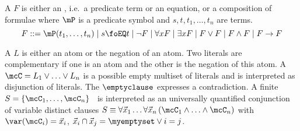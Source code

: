%
\begin{definition}\label{def:first-order}
A  $F$ is either an
, i.e.~a predicate term or an equation, or a composition of formulae where $\mP$ is a predicate symbol and $s,t,t_1,\ldots,t_n$ are terms.
%
\[
 F ::= \mP(t_1,\ldots,t_n) \mid
	s \foEQ t \mid
	\lnot F \mid
	\forall x F \mid
	\exists x F \mid
	 F\lor F \mid
	 F\land F \mid
	 F\rightarrow F
\]
\end{definition}
\begin{definition}\label{def:literals}
A  $L$ is either an atom
or the negation of an atom.
Two literals are complementary if one is an atom and the other is the negation of this atom.
%
A \ \ $\mcC = L_1\lor\ldots\lor L_n$  is a possible empty multiset of literals and is interpreted as disjunction of literals.
The  $\emptyclause$ expresses a contradiction.
A finite  $S=\{ \mcC_1,\ldots,\mcC_n \}$ 
is interpreted as an universally quantified conjunction of variable distinct clauses
$S\equiv\forall\vec{x}_1\ldots\forall\vec{x}_n\left(\mcC_1\land\ldots\land\mcC_n\right)$ with
$\var(\mcC_i)=\vec{x}_i$,
$\vec{x}_i\cap\vec{x}_j=\myemptyset\lor i=j$.
\end{definition}

